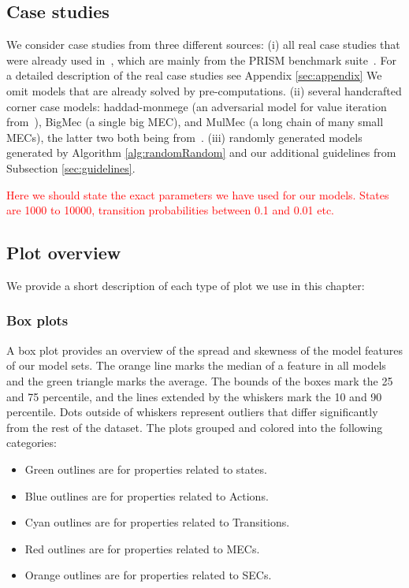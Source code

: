 \subsection{Case studies}
We consider case studies from three different sources: 
(i) all real case studies that were already used in~\cite{gandalf}, which are mainly from the PRISM benchmark suite~\cite{PRISMben}.
For a detailed description of the real case studies see Appendix \ref{sec:appendix}
We omit models that are already solved by pre-computations.
(ii) several handcrafted corner case models: haddad-monmege (an adversarial model for value iteration from~\cite{haddadmonmege}), BigMec (a single big MEC), and MulMec (a long chain of many small MECs), the latter two both being from~\cite{gandalf}.
(iii) randomly generated models generated by Algorithm \ref{alg:randomRandom} and our additional guidelines from Subsection \ref{sec:guidelines}.

\textcolor{red}{Here we should state the exact parameters we have used for our models. States are 1000 to 10000, transition probabilities between 0.1 and 0.01 etc.}

\subsection{Plot overview} \label{subsec:plots}
We provide a short description of each type of plot we use in this chapter:
\subsubsection*{Box plots} \label{plot:boxplot}
A box plot provides an overview of the spread and skewness of the model features of our model sets.
The orange line marks the median of a feature in all models and the green triangle marks the
average. The bounds of the boxes mark the 25 and 75 percentile, and the lines extended
by the whiskers mark the 10 and 90 percentile. Dots outside of whiskers represent
outliers that differ significantly from the rest of the dataset.
The plots grouped and colored into the following categories:
\begin{itemize}
    \item Green outlines are for properties related to states. 
    \item Blue outlines are for properties related to Actions. 
    \item Cyan outlines are for properties related to Transitions.
    \item Red outlines are for properties related to MECs.
    \item Orange outlines are for properties related to SECs. 
\end{itemize}

